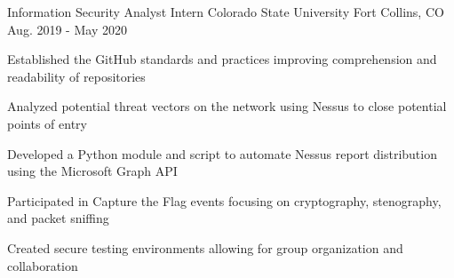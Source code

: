 \vspace{-5.0mm}


\begin{cventries}
  

  \cventry
    {Information Security Analyst Intern} %
    {Colorado State University} %
    {Fort Collins, CO} %
    {Aug. 2019 - May 2020} %
    {
      \begin{cvitems} %
        \item {Established the GitHub standards and practices improving comprehension and readability of repositories}
        \item {Analyzed potential threat vectors on the network using Nessus to close potential points of entry}
        \item {Developed a Python module and script to automate Nessus report distribution using the Microsoft Graph API}
        \item {Participated in Capture the Flag events focusing on cryptography, stenography, and packet sniffing}
        \item {Created secure testing environments allowing for group organization and collaboration}
      \end{cvitems}
    }


\end{cventries}
